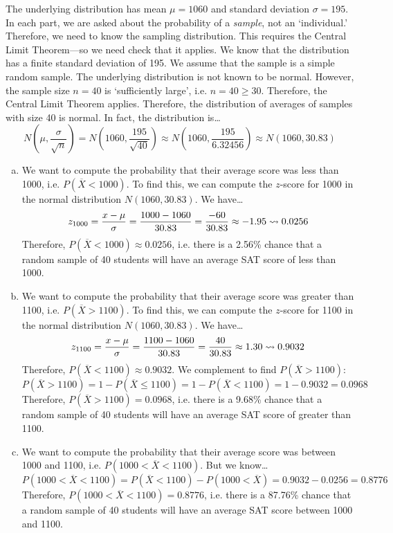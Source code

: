 \documentclass[11pt,letterpaper]{article}
\begin{document}
\sol The underlying distribution has mean $\mu= 1060$ and standard deviation $\sigma= 195$. In each part, we are asked about the probability of a \textit{sample}, not an `individual.' Therefore, we need to know the sampling distribution. This requires the Central Limit Theorem---so we need check that it applies. We know that the distribution has a finite standard deviation of 195. We assume that the sample is a simple random sample. The underlying distribution is not known to be normal. However, the sample size $n= 40$ is `sufficiently large', i.e. $n= 40 \geq 30$. Therefore, the Central Limit Theorem applies. Therefore, the distribution of averages of samples with size 40 is normal. In fact, the distribution is\dots
	\[
	N\left(\mu, \dfrac{\sigma}{\sqrt{n}} \right)= N\left(1060, \dfrac{195}{\sqrt{40}} \right) \approx N\left(1060, \dfrac{195}{6.32456} \right) \approx N\left(1060, 30.83 \right)
	\]

\begin{enumerate}[(a)]
\item We want to compute the probability that their average score was less than 1000, i.e. $P(\overline{X} < 1000)$. To find this, we can compute the $z$-score for 1000 in the normal distribution $N(1060, 30.83)$. We have\dots
	\[
	z_{1000}= \dfrac{x - \mu}{\sigma}= \dfrac{1000 - 1060}{30.83}= \dfrac{-60}{30.83} \approx -1.95 \rightsquigarrow 0.0256
	\]
Therefore, $P(\overline{X} < 1000) \approx 0.0256$, i.e. there is a 2.56\% chance that a random sample of 40 students will have an average SAT score of less than 1000. \pspace

\item We want to compute the probability that their average score was greater than 1100, i.e. $P(\overline{X} > 1100)$. To find this, we can compute the $z$-score for 1100 in the normal distribution $N(1060, 30.83)$. We have\dots
	\[
	z_{1100}= \dfrac{x - \mu}{\sigma}= \dfrac{1100 - 1060}{30.83}= \dfrac{40}{30.83} \approx 1.30 \rightsquigarrow 0.9032
	\]
Therefore, $P(\overline{X} < 1100) \approx 0.9032$. We complement to find $P(\overline{X} > 1100)$:
	\[
	P(\overline{X} > 1100)= 1 - P(\overline{X} \leq 1100)= 1 - P(\overline{X} < 1100)= 1 - 0.9032= 0.0968
	\]
Therefore, $P(\overline{X} > 1100)= 0.0968$, i.e. there is a 9.68\% chance that a random sample of 40 students will have an average SAT score of greater than 1100. \pspace 

\item We want to compute the probability that their average score was between 1000 and 1100, i.e. $P(1000 < \overline{X} < 1100)$. But we know\dots
	\[
	P(1000 < \overline{X} < 1100)= P(\overline{X} < 1100) - P(1000 < \overline{X})= 0.9032 - 0.0256= 0.8776
	\]
Therefore, $P(1000 < \overline{X} < 1100)= 0.8776$, i.e. there is a 87.76\% chance that a random sample of 40 students will have an average SAT score between 1000 and 1100. 
\end{enumerate}
\end{document}

